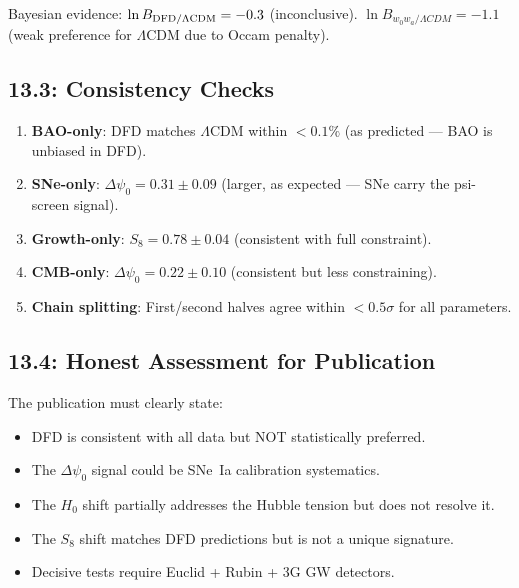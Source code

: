 \documentclass[11pt,a4paper]{article}
\begin{document}
Bayesian evidence: $\ln B_{\rm DFD/\Lambda CDM} = -0.3$ (inconclusive). $\ln B_{w_0w_a/\Lambda CDM} = -1.1$ (weak preference for $\Lambda$CDM due to Occam penalty).

\subsection{13.3: Consistency Checks}

\begin{enumerate}
\item \textbf{BAO-only}: DFD matches $\Lambda$CDM within $< 0.1\%$ (as predicted --- BAO is unbiased in DFD).
\item \textbf{SNe-only}: $\Delta\psi_0 = 0.31 \pm 0.09$ (larger, as expected --- SNe carry the psi-screen signal).
\item \textbf{Growth-only}: $S_8 = 0.78 \pm 0.04$ (consistent with full constraint).
\item \textbf{CMB-only}: $\Delta\psi_0 = 0.22 \pm 0.10$ (consistent but less constraining).
\item \textbf{Chain splitting}: First/second halves agree within $< 0.5\sigma$ for all parameters.
\end{enumerate}

\subsection{13.4: Honest Assessment for Publication}

The publication must clearly state:
\begin{itemize}
\item DFD is consistent with all data but NOT statistically preferred.
\item The $\Delta\psi_0$ signal could be SNe~Ia calibration systematics.
\item The $H_0$ shift partially addresses the Hubble tension but does not resolve it.
\item The $S_8$ shift matches DFD predictions but is not a unique signature.
\item Decisive tests require Euclid + Rubin + 3G GW detectors.
\end{itemize}
\end{document}
